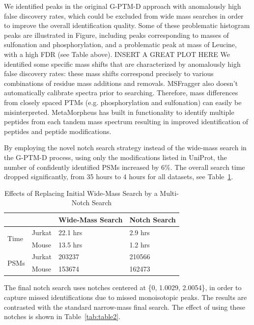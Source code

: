 \documentclass[journal=jprobs,manuscript=article]{achemso}
\begin{document}
We identified peaks in the original G-PTM-D approach with anomalously high false discovery rates, which could be excluded from wide mass searches in order to improve the overall identification quality.
Some of these problematic histogram peaks are illustrated in Figure, including peaks corresponding to masses of sulfonation and phosphorylation, and a problematic peak at mass of Leucine, with a high FDR (see Table above).
INSERT A GREAT PLOT HERE We identified some specific mass shifts that are characterized by anomalously high false discovery rates: these mass shifts correspond precisely to various combinations of residue mass additions and removals.
MSFragger also doesn’t automatically calibrate spectra prior to searching.
Therefore, mass differences from closely spaced PTMs (e.g. phosphorylation and sulfonation) can easily be misinterpreted.
MetaMorpheus has built in functionality to identify multiple peptides from each tandem mass spectrum resulting in improved identification of peptides and peptide modifications.

By employing the novel notch search strategy instead of the wide-mass search in the G-PTM-D process, using only the modifications listed in UniProt, the number of confidently identified PSMs increased by 6\%.
The overall search time dropped significantly, from 35 hours to 4 hours for all datasets, see Table~\ref{my-labelff}.

\begin{table}[]
\centering
\caption{Effects of Replacing Initial Wide-Mass Search by a Multi-Notch Search}
\label{my-labelff}
\begin{tabular}{ll|l|l}
                      &        & Wide-Mass Search & Notch Search\\
\hline
\multirow{2}{*}{Time} & Jurkat & 22.1 hrs         & 2.9 hrs    \\
                      & Mouse  & 13.5 hrs         & 1.2 hrs   \\
\hline
\multirow{2}{*}{PSMs} & Jurkat & 203237           & 210566    \\
                      & Mouse  & 153674           & 162473   
\end{tabular}
\end{table}


The final notch search uses notches centered at \{0, 1.0029, 2.0054\}, in order to capture missed identifications due to missed monoisotopic peaks.
The results are contrasted with the standard narrow-mass final search.
The effect of using these notches is shown in Table~\ref{tab:table2}.
\end{document}

